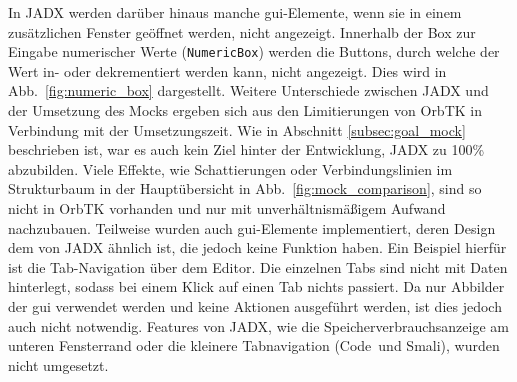 In JADX werden darüber hinaus manche \gls{gui}-Elemente, wenn sie in einem zusätzlichen Fenster geöffnet werden, nicht angezeigt. Innerhalb der Box zur Eingabe numerischer Werte (\texttt{NumericBox}) werden die Buttons, durch welche der Wert in- oder dekrementiert werden kann, nicht angezeigt. Dies wird in Abb.~\ref{fig:numeric_box} dargestellt.
Weitere Unterschiede zwischen JADX und der Umsetzung des Mocks ergeben sich aus den Limitierungen von OrbTK in Verbindung mit der Umsetzungszeit. Wie in Abschnitt \ref{subsec:goal_mock} beschrieben ist, war es auch kein Ziel hinter der Entwicklung, JADX zu 100\% abzubilden. Viele Effekte, wie Schattierungen oder Verbindungslinien im Strukturbaum in der Hauptübersicht in Abb.~\ref{fig:mock_comparison}, sind so nicht in OrbTK vorhanden und nur mit unverhältnismäßigem Aufwand nachzubauen. Teilweise wurden auch \gls{gui}-Elemente implementiert, deren Design dem von JADX ähnlich ist, die jedoch keine Funktion haben. Ein Beispiel hierfür ist die Tab-Navigation über dem Editor. Die einzelnen Tabs sind nicht mit Daten hinterlegt, sodass bei einem Klick auf einen Tab nichts passiert. Da nur Abbilder der \gls{gui} verwendet werden und keine Aktionen ausgeführt werden, ist dies jedoch auch nicht notwendig. Features von JADX, wie die Speicherverbrauchsanzeige am unteren Fensterrand oder die kleinere Tabnavigation (\glqq Code\grqq\ und \glqq Smali\grqq ), wurden nicht umgesetzt.


